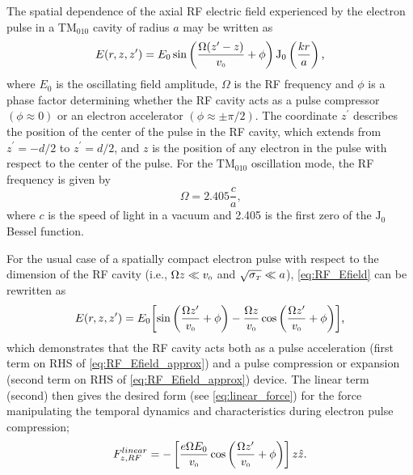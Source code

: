 The spatial dependence of the axial RF electric field experienced by the electron pulse in a TM$_{010}$ cavity of radius $a$ may be written as
\begin{equation} \label{eq:RF_Efield}
  E ( r , z , z^{\prime} ) = E_{0} \sin \left ( \frac{ \Omega ( z^{\prime} - z ) }{ v_{{\scriptscriptstyle 0}} } + \phi \right )\operatorname{J_{0}} \left ( \frac{ k r }{ a } \right ) \text{,}
\end{equation}
where $ E_{ 0 } $ is the oscillating field amplitude, $\Omega$ is the RF frequency and $\phi$ is a phase factor determining whether the RF cavity acts as a pulse compressor $ ( \phi \approx 0 ) $ or an electron accelerator $ ( \phi \approx \pm \pi/2 ) $.
The coordinate $z^{\prime} $ describes the position of the center of the pulse in the RF cavity, which extends from $ z^{\prime} = - d / 2 $ to $ z^{\prime} = d / 2 $, and $z$ is the position of any electron in the pulse with respect to the center of the pulse.
For the $\text{TM}_{010}$ oscillation mode, the RF frequency is given by
\begin{equation}
  \Omega = 2.405 \frac{ c }{a} \text{,}
\end{equation}
where $c$ is the speed of light in a vacuum and 2.405 is the first zero of the $\operatorname{ J_{0} }$ Bessel function.

For the usual case of a spatially compact electron pulse with respect to the dimension of the RF cavity (i.e., $ \Omega z \ll v_{{\scriptscriptstyle 0}} $ and $ \sqrt{\sigma_{{\scriptscriptstyle T}}} \ll a $), \ref{eq:RF_Efield} can be rewritten as
\begin{equation} \label{eq:RF_Efield_approx}
  E ( r , z , z^{\prime} ) = E_{0} \biggl [ \sin \left ( \frac{ \Omega z^{\prime} }{ v_{{\scriptscriptstyle 0}} } + \phi \right ) - \frac{ \Omega z }{ v_{{\scriptscriptstyle 0}} } \cos \left ( \frac{ \Omega z^{\prime} }{ v_{{\scriptscriptstyle 0}} } + \phi \right ) \biggr ] \text{,}
\end{equation}
which demonstrates that the RF cavity acts both as a pulse acceleration (first term on RHS of \ref{eq:RF_Efield_approx}) and a pulse compression or expansion (second term on RHS of \ref{eq:RF_Efield_approx}) device. %
The linear term (second) then gives the desired form (see \ref{eq:linear_force}) for the force manipulating the temporal dynamics and characteristics during electron pulse compression;
\begin{equation} \label{eq:RF_Force_z}
  F_{ z , RF }^{linear} = - \left [ \frac{ e \Omega E_{0} }{ v_{{\scriptscriptstyle 0}} } \cos \left ( \frac{ \Omega z^{\prime} }{ v_{{\scriptscriptstyle 0}} } + \phi \right ) \right ] z \hat{ z } \text{.}
\end{equation}

